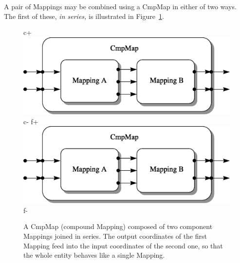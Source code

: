 \documentclass[twoside,11pt]{article}
\newenvironment{latexonly}{}{}
\begin{document}
\begin{latexonly}
   A pair of Mappings may be combined using a CmpMap in either of two
   ways. The first of these, {\em{in series,}} is illustrated in
   Figure~\ref{fig:seriescmpmap}.
   \begin{figure}
   \begin{center}
c+
   \includegraphics[scale=0.5]{sun211_figures/series.eps}
c-
f+
   \includegraphics[scale=0.5]{sun210_figures/series.eps}
f-
   \caption{A CmpMap (compound Mapping) composed of two component
   Mappings joined in series. The output coordinates of the first Mapping
   feed into the input coordinates of the second one, so that the whole
   entity behaves like a single Mapping.}
   \label{fig:seriescmpmap}
   \end{center}
   \end{figure}
\end{latexonly}
\end{document}
